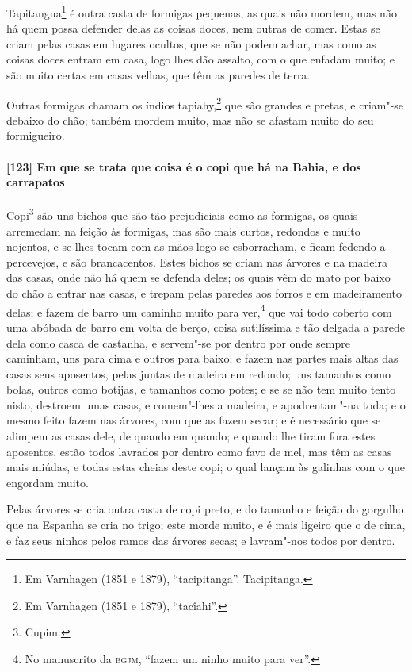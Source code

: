 \begin{linenumbers}
Tapitangua\footnote{ Em Varnhagen (1851 e 1879), ``tacipitanga''. Tacipitanga.} é outra
casta de formigas pequenas, as quais não mordem, mas não há quem possa defender delas as
coisas doces, nem outras de comer. Estas se criam pelas casas em lugares ocultos, que se
não podem achar, mas como as coisas doces entram em casa, logo lhes dão assalto, com o que
enfadam muito; e são muito certas em casas velhas, que têm as paredes de terra.

Outras formigas chamam os índios tapiahy,\footnote{ Em Varnhagen (1851 e 1879),
``tacîahi''.} que são grandes e pretas, e criam"-se debaixo do chão; também mordem muito,
mas não se afastam muito do seu formigueiro.

\paragraph{[123] Em que se trata que coisa é o copi que há na Bahia, e dos carrapatos}\quad
Copi\footnote{ Cupim.} são uns bichos que são tão prejudiciais como as formigas, os quais
arremedam na feição às formigas, mas são mais curtos, redondos e muito nojentos, e se lhes
tocam com as mãos logo se esborracham, e ficam fedendo a percevejos, e são brancacentos.
Estes bichos se criam nas árvores e na madeira das casas, onde não há quem se defenda
deles; os quais vêm do mato por baixo do chão a entrar nas casas, e trepam pelas paredes
aos forros e em madeiramento delas; e fazem de barro um caminho muito para ver,\footnote{
No manuscrito da \textsc{bgjm}, ``fazem um ninho muito para ver''.} que vai todo coberto
com uma abóbada de barro em volta de berço, coisa sutilíssima e tão delgada a parede dela
como casca de castanha, e servem"-se por dentro por onde sempre caminham, uns para cima e
outros para baixo; e fazem nas partes mais altas das casas seus aposentos, pelas juntas de
madeira em redondo; uns tamanhos como bolas, outros como botijas, e tamanhos como potes; e
se se não tem muito tento nisto, destroem umas casas, e comem"-lhes a madeira, e
apodrentam"-na toda; e o mesmo feito fazem nas árvores, com que as fazem secar; e é
necessário que se alimpem as casas dele, de quando em quando; e quando lhe tiram fora
estes aposentos, estão todos lavrados por dentro como favo de mel, mas têm as casas mais
miúdas, e todas estas cheias deste copi; o qual lançam às galinhas com o que engordam
muito.

Pelas árvores se cria outra casta de copi preto, e do tamanho e feição do gorgulho que na
Espanha se cria no trigo; este morde muito, e é mais ligeiro que o de cima, e faz seus
ninhos pelos ramos das árvores secas; e lavram"-nos todos por dentro.


\end{linenumbers}

